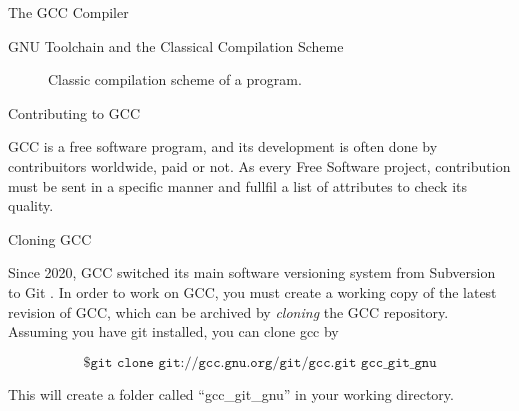 \begin{section}{The GCC Compiler}
\begin{subsection}{GNU Toolchain and the Classical Compilation Scheme}
\begin{figure}
\begin{center}
{
}
\end{center}
\caption{Classic compilation scheme of a program.}
\label{fig:classical_build}
\end{figure}

\end{subsection}

\begin{section}{Contributing to GCC}

GCC is a free software program, and its development is often done by
contribuitors worldwide, paid or not. As every Free Software project,
contribution must be sent in a specific manner and fullfil a list
of attributes to check its quality.

\begin{subsection}{Cloning GCC}

Since 2020, GCC switched its main software versioning system from Subversion
to Git \cite{gcc_git}. In order to work on GCC, you must create a working
copy of the latest revision of GCC, which can be archived by \textit{cloning}
the GCC repository. Assuming you have git installed, you can clone
gcc by

$$\texttt{\$ git clone git://gcc.gnu.org/git/gcc.git gcc\_git\_gnu}$$

This will create a folder called ``gcc\_git\_gnu'' in your working directory.


\end{subsection}
\end{section}
\end{section}
